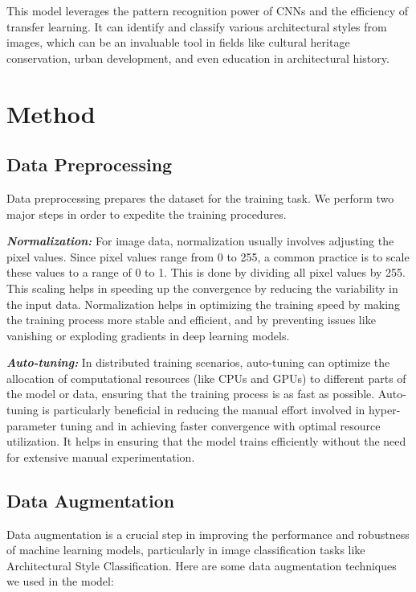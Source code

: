 \documentclass{article}
\begin{document}
This model leverages the pattern recognition power of CNNs and the efficiency of transfer learning. It can identify and classify various architectural styles from images, which can be an invaluable tool in fields like cultural heritage conservation, urban development, and even education in architectural history.



\section{Method}
\subsection{Data Preprocessing}
Data preprocessing prepares the dataset for the training task. We perform two major steps in order to expedite the training procedures.

\emph{\textbf{Normalization:}} For image data, normalization usually involves adjusting the pixel values. Since pixel values range from 0 to 255, a common practice is to scale these values to a range of 0 to 1. This is done by dividing all pixel values by 255. This scaling helps in speeding up the convergence by reducing the variability in the input data. Normalization helps in optimizing the training speed by making the training process more stable and efficient, and by preventing issues like vanishing or exploding gradients in deep learning models.

\emph{\textbf{Auto-tuning:}} In distributed training scenarios, auto-tuning can optimize the allocation of computational resources (like CPUs and GPUs) to different parts of the model or data, ensuring that the training process is as fast as possible. Auto-tuning is particularly beneficial in reducing the manual effort involved in hyper-parameter tuning and in achieving faster convergence with optimal resource utilization. It helps in ensuring that the model trains efficiently without the need for extensive manual experimentation.

\subsection{Data Augmentation}
Data augmentation is a crucial step in improving the performance and robustness of machine learning models, particularly in image classification tasks like Architectural Style Classification. Here are some data augmentation techniques we used in the model:
\end{document}
